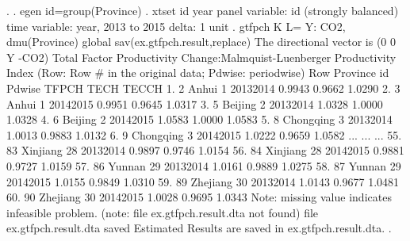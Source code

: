 . 
. egen id=group(Province)
{\smallskip}
. xtset id year
       panel variable:  id (strongly balanced)
        time variable:  year, 2013 to 2015
                delta:  1 unit
{\smallskip}
. gtfpch K L= Y: CO2, dmu(Province) global sav(ex.gtfpch.result,replace)
{\smallskip}
 The directional vector is (0 0 Y -CO2)
{\smallskip}
{\smallskip}
 Total Factor Productivity Change:Malmquist-Luenberger Productivity Index
    (Row: Row \# in the original data; Pdwise: periodwise)
{\smallskip}
     {\TLC}
     {\VBAR} Row       Province   id      Pdwise    TFPCH     TECH    TECCH {\VBAR}
     {\LFTT}
  1. {\VBAR}   2          Anhui    1   2013{\tytilde}2014   0.9943   0.9662   1.0290 {\VBAR}
  2. {\VBAR}   3          Anhui    1   2014{\tytilde}2015   0.9951   0.9645   1.0317 {\VBAR}
  3. {\VBAR}   5        Beijing    2   2013{\tytilde}2014   1.0328   1.0000   1.0328 {\VBAR}
  4. {\VBAR}   6        Beijing    2   2014{\tytilde}2015   1.0583   1.0000   1.0583 {\VBAR}
  5. {\VBAR}   8      Chongqing    3   2013{\tytilde}2014   1.0013   0.9883   1.0132 {\VBAR}
  6. {\VBAR}   9      Chongqing    3   2014{\tytilde}2015   1.0222   0.9659   1.0582 {\VBAR}
                                     ...
                                     ...
                                     ...
 55. {\VBAR}  83       Xinjiang   28   2013{\tytilde}2014   0.9897   0.9746   1.0154 {\VBAR}
 56. {\VBAR}  84       Xinjiang   28   2014{\tytilde}2015   0.9881   0.9727   1.0159 {\VBAR}
 57. {\VBAR}  86         Yunnan   29   2013{\tytilde}2014   1.0161   0.9889   1.0275 {\VBAR}
 58. {\VBAR}  87         Yunnan   29   2014{\tytilde}2015   1.0155   0.9849   1.0310 {\VBAR}
 59. {\VBAR}  89       Zhejiang   30   2013{\tytilde}2014   1.0143   0.9677   1.0481 {\VBAR}
 60. {\VBAR}  90       Zhejiang   30   2014{\tytilde}2015   1.0028   0.9695   1.0343 {\VBAR}
     {\BLC}
Note: missing value indicates infeasible problem.
(note: file ex.gtfpch.result.dta not found)
file ex.gtfpch.result.dta saved
{\smallskip}
Estimated Results are saved in ex.gtfpch.result.dta.
{\smallskip}
. 
